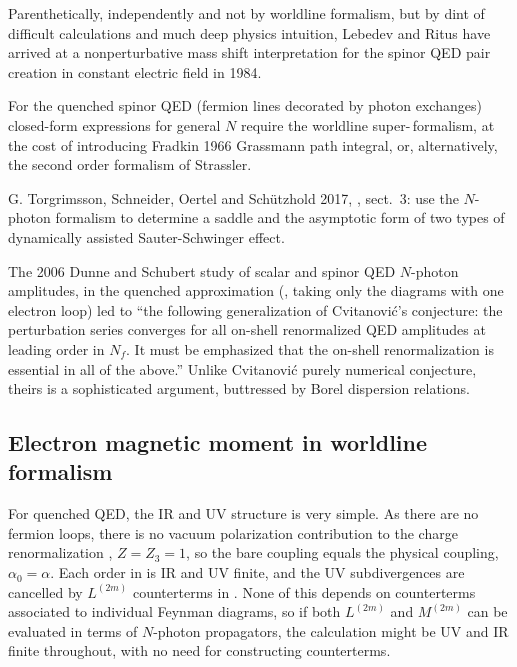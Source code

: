Parenthetically, independently and not by worldline formalism, but by
dint of difficult calculations and much deep physics intuition, Lebedev
and Ritus have arrived at a nonperturbative mass shift
interpretation for the spinor QED pair creation in constant electric
field in 1984.

For the quenched spinor QED (fermion lines decorated by photon exchanges)
closed-form expressions for general $N$ require the worldline
super-\,formalism, at the cost of introducing Fradkin
1966 Grassmann path integral,
or, alternatively,
the second order
formalism of Strassler.


    G. Torgrimsson, Schneider,  Oertel and Schützhold 2017,
, sect.~3:
use the $N$-photon formalism to determine a saddle and the asymptotic
form of two types of dynamically assisted {Sauter-Schwinger} effect.

The 2006 Dunne and Schubert study of scalar and spinor QED
$N$-photon amplitudes, in the quenched approximation (\ie, taking only
the diagrams with one electron loop) led to ``the following
generalization of Cvitanovi\'c's conjecture: the perturbation series
converges for all on-shell renormalized QED amplitudes at leading order
in $N_f$. It must be emphasized that the on-shell renormalization is
essential in all of the above.''
Unlike Cvitanovi\'c purely numerical conjecture, theirs is a
sophisticated argument, buttressed by Borel dispersion relations.



\subsection{Electron magnetic moment in worldline formalism}
\label{sect:magMomWorldline}

For quenched QED, the IR and UV structure is very simple. As there are no
fermion loops, there is no vacuum polarization contribution to the charge
renormalization , $Z=Z_3=1$, so the bare coupling equals
the physical coupling, $\alpha_0= \alpha$. Each order in
 is IR and UV finite, and the UV subdivergences are
cancelled by $L^{(2m)}$ counterterms in . None
of this depends on counterterms associated to individual Feynman
diagrams, so if both $L^{(2m)}$ and $M^{(2m)}$ can be evaluated in terms of
$N$-photon propagators, the calculation might be UV and IR finite
throughout, with no need for constructing counterterms.

